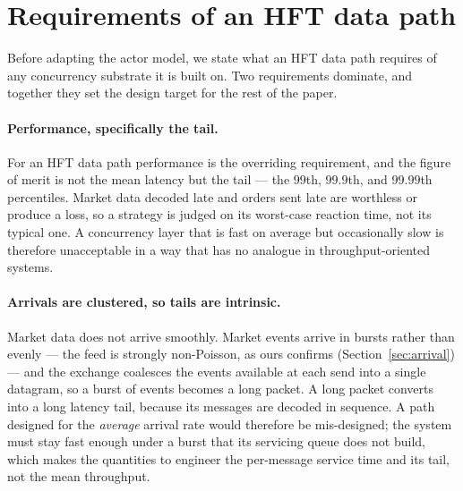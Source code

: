 \documentclass[11pt]{article}
\begin{document}
\section{Requirements of an HFT data path}
\label{sec:requirements}

Before adapting the actor model, we state what an HFT data path requires of any
concurrency substrate it is built on. Two requirements dominate, and together
they set the design target for the rest of the paper.

\paragraph{Performance, specifically the tail.} For an HFT data path performance
is the overriding requirement, and the figure of merit is not the mean latency
but the tail --- the $99$th, $99.9$th, and $99.99$th percentiles. Market data
decoded late and orders sent late are worthless or produce a loss, so a strategy
is judged on its worst-case reaction time, not its typical one. A concurrency
layer that is fast on average but occasionally slow is therefore unacceptable in
a way that has no analogue in throughput-oriented systems.

\paragraph{Arrivals are clustered, so tails are intrinsic.} Market data does not
arrive smoothly. Market events arrive in bursts rather than evenly --- the feed is
strongly non-Poisson, as ours confirms (Section~\ref{sec:arrival}) --- and the
exchange coalesces the events available at each send into a single datagram, so a
burst of events becomes a long packet. A long packet converts into a
long latency tail, because its messages are decoded in sequence. A path designed
for the \emph{average} arrival rate would therefore be mis-designed; the system
must stay fast enough under a burst that its servicing queue does not build,
which makes the quantities to engineer the per-message service time and its tail,
not the mean throughput.
\end{document}

